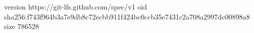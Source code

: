 version https://git-lfs.github.com/spec/v1
oid sha256:f743f964b3a7e9db8c72ecbb911f424bc0ccb35e7431c2a708a2997dc00898a8
size 786528
